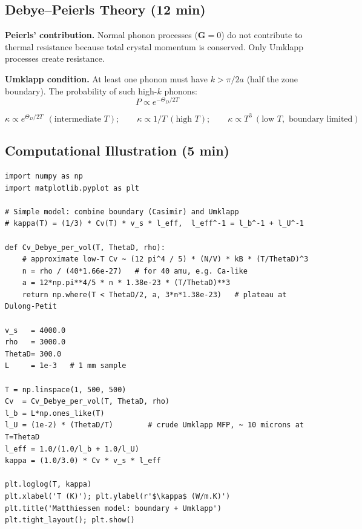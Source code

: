\documentclass[11pt,a4paper]{article}
\begin{document}
\subsection{Debye--Peierls Theory \hfill \small(12 min)}

\textbf{Peierls' contribution.} Normal phonon processes ($\mathbf G=0$) do not
contribute to thermal resistance because total crystal momentum is conserved. Only
Umklapp processes create resistance.

\textbf{Umklapp condition.} At least one phonon must have $k>\pi/2a$ (half the zone
boundary). The probability of such high-$k$ phonons:
\[
P \propto e^{-\Theta_D/2T}
\]

\begin{keybox}
\[
\kappa \propto e^{\Theta_D/2T} \ \ (\text{intermediate } T); \qquad
\kappa\propto1/T \ (\text{high } T); \qquad
\kappa\propto T^3 \ (\text{low } T,\text{ boundary limited})
\]
\end{keybox}

\subsection{Computational Illustration \hfill \small(5 min)}

\begin{pybox}
\begin{lstlisting}
import numpy as np
import matplotlib.pyplot as plt

# Simple model: combine boundary (Casimir) and Umklapp
# kappa(T) = (1/3) * Cv(T) * v_s * l_eff,  l_eff^-1 = l_b^-1 + l_U^-1

def Cv_Debye_per_vol(T, ThetaD, rho):
    # approximate low-T Cv ~ (12 pi^4 / 5) * (N/V) * kB * (T/ThetaD)^3
    n = rho / (40*1.66e-27)   # for 40 amu, e.g. Ca-like
    a = 12*np.pi**4/5 * n * 1.38e-23 * (T/ThetaD)**3
    return np.where(T < ThetaD/2, a, 3*n*1.38e-23)   # plateau at Dulong-Petit

v_s   = 4000.0
rho   = 3000.0
ThetaD= 300.0
L     = 1e-3   # 1 mm sample

T = np.linspace(1, 500, 500)
Cv  = Cv_Debye_per_vol(T, ThetaD, rho)
l_b = L*np.ones_like(T)
l_U = (1e-2) * (ThetaD/T)        # crude Umklapp MFP, ~ 10 microns at T=ThetaD
l_eff = 1.0/(1.0/l_b + 1.0/l_U)
kappa = (1.0/3.0) * Cv * v_s * l_eff

plt.loglog(T, kappa)
plt.xlabel('T (K)'); plt.ylabel(r'$\kappa$ (W/m.K)')
plt.title('Matthiessen model: boundary + Umklapp')
plt.tight_layout(); plt.show()
\end{lstlisting}
\end{pybox}
\end{document}

